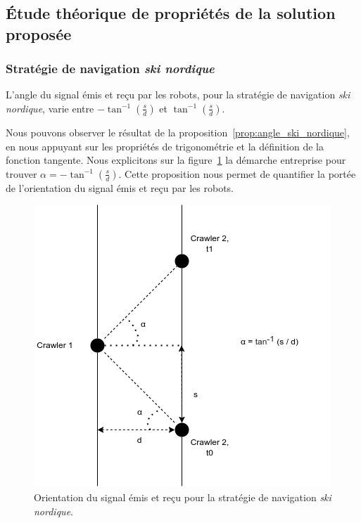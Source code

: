 \documentclass[english,RandD]{rapportPFE}  %
\begin{document}
		\subsection{Étude théorique de propriétés de la solution proposée}
			\subsubsection*{Stratégie de navigation \textit{ski nordique}}
				\begin{Proposition}
					L'angle du signal émis et reçu par les robots, pour la stratégie de navigation \textit{ski nordique}, varie entre $-\tan^{-1}(\frac{s}{d})$ et $\tan^{-1}(\frac{s}{d})$.
					\label{prop:angle_ski_nordique}
				\end{Proposition}

				Nous pouvons observer le résultat de la proposition~\ref{prop:angle_ski_nordique}, en nous appuyant sur les propriétés de trigonométrie et la définition de la fonction tangente.
				Nous explicitons sur la figure~\ref{fig:angle_ski_nordique} la démarche entreprise pour trouver $\alpha = -\tan^{-1}(\frac{s}{d})$.
				Cette proposition nous permet de quantifier la portée de l'orientation du signal émis et reçu par les robots.

				\begin{figure}[h!]
					\centering
					\includegraphics[scale=0.5]{graphics/angle_ski_nordique.png}
					\caption{Orientation du signal émis et reçu pour la stratégie de navigation \textit{ski nordique}.}
					\label{fig:angle_ski_nordique}
				\end{figure}
\end{document}

